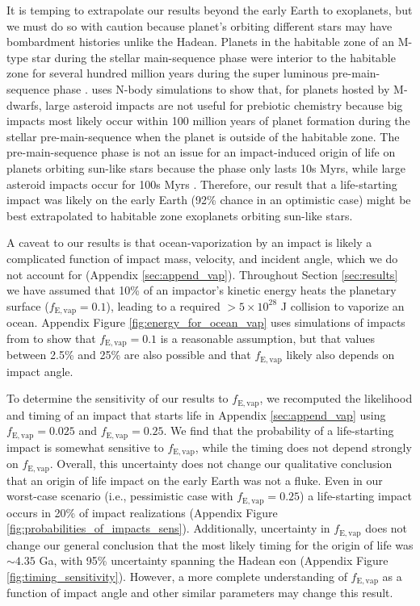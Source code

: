 \documentclass[manuscript]{aastex63}
\begin{document}
It is temping to extrapolate our results beyond the early Earth to exoplanets, but we must do so with caution because planet's orbiting different stars may have bombardment histories unlike the Hadean. Planets in the habitable zone of an M-type star during the stellar main-sequence phase were interior to the habitable zone for several hundred million years during the super luminous pre-main-sequence phase \citep{Luger_2015}. \citet{Lichtenberg_2022} uses N-body simulations to show that, for planets hosted by M-dwarfs, large asteroid impacts are not useful for prebiotic chemistry because big impacts most likely occur within 100 million years of planet formation during the stellar pre-main-sequence when the planet is outside of the habitable zone. The pre-main-sequence phase is not an issue for an impact-induced origin of life on planets orbiting sun-like stars because the phase only lasts 10s Myrs, while large asteroid impacts occur for 100s Myrs \citep{Lichtenberg_2022}. Therefore, our result that a life-starting impact was likely on the early Earth (92\% chance in an optimistic case) might be best extrapolated to habitable zone exoplanets orbiting sun-like stars.

A caveat to our results is that ocean-vaporization by an impact is likely a complicated function of impact mass, velocity, and incident angle, which we do not account for (Appendix \ref{sec:append_vap}). Throughout Section \ref{sec:results} we have assumed that 10\% of an impactor's kinetic energy heats the planetary surface ($f_\mathrm{E,vap} = 0.1$), leading to a required $> 5 \times 10^{28}$ J collision to vaporize an ocean. Appendix Figure \ref{fig:energy_for_ocean_vap} uses simulations of impacts from \citet{Citron_2022} to show that $f_\mathrm{E,vap} = 0.1$ is a reasonable assumption, but that values between 2.5\% and 25\% are also possible and that $f_\mathrm{E,vap}$ likely also depends on impact angle.

To determine the sensitivity of our results to $f_\mathrm{E,vap}$, we recomputed the likelihood and timing of an impact that starts life in Appendix \ref{sec:append_vap} using $f_\mathrm{E,vap} = 0.025$ and $f_\mathrm{E,vap} = 0.25$. We find that the probability of a life-starting impact is somewhat sensitive to $f_\mathrm{E,vap}$, while the timing does not depend strongly on $f_\mathrm{E,vap}$. Overall, this uncertainty does not change our qualitative conclusion that an origin of life impact on the early Earth was not a fluke. Even in our worst-case scenario (i.e., \citet{Wogan_2023} pessimistic case with $f_\mathrm{E,vap} = 0.25$) a life-starting impact occurs in 20\% of impact realizations (Appendix Figure \ref{fig:probabilities_of_impacts_sens}). Additionally, uncertainty in $f_\mathrm{E,vap}$ does not change our general conclusion that the most likely timing for the origin of life was $\sim 4.35$ Ga, with 95\% uncertainty spanning the Hadean eon (Appendix Figure \ref{fig:timing_sensitivity}). However, a more complete understanding of $f_\mathrm{E,vap}$ as a function of impact angle and other similar parameters may change this result.
\end{document}
